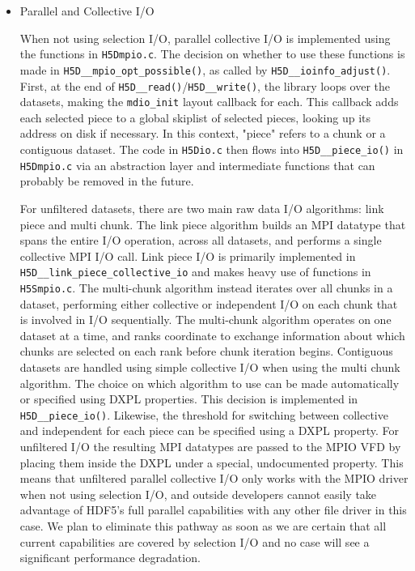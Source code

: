 \begin{itemize}
    \item Parallel and Collective I/O

When not using selection I/O, parallel collective I/O is implemented using the functions in \texttt{H5Dmpio.c}. The decision on whether to use these functions is made in \texttt{H5D\_\_mpio\_opt\_possible()}, as called by \texttt{H5D\_\_ioinfo\_adjust()}. First, at the end of \texttt{H5D\_\_read()}/\texttt{H5D\_\_write()}, the library loops over the datasets, making the \texttt{mdio\_init} layout callback for each. This callback adds each selected piece to a global skiplist of selected pieces, looking up its address on disk if necessary. In this context, "piece" refers to a chunk or a contiguous dataset. The code in \texttt{H5Dio.c} then flows into \texttt{H5D\_\_piece\_io()} in \texttt{H5Dmpio.c} via an abstraction layer and intermediate functions that can probably be removed in the future.

For unfiltered datasets, there are two main raw data I/O algorithms: link piece and multi chunk. The link piece algorithm builds an MPI datatype that spans the entire I/O operation, across all datasets, and performs a single collective MPI I/O call. Link piece I/O is primarily implemented in \texttt{H5D\_\_link\_piece\_collective\_io} and makes heavy use of functions in \texttt{H5Smpio.c}. The multi-chunk algorithm instead iterates over all chunks in a dataset, performing either collective or independent I/O on each chunk that is involved in I/O sequentially. The multi-chunk algorithm operates on one dataset at a time, and ranks coordinate to exchange information about which chunks are selected on each rank before chunk iteration begins. Contiguous datasets are handled using simple collective I/O when using the multi chunk algorithm. The choice on which algorithm to use can be made automatically or specified using DXPL properties. This decision is implemented in \texttt{H5D\_\_piece\_io()}. Likewise, the threshold for switching between collective and independent for each piece can be specified using a DXPL property. For unfiltered I/O the resulting MPI datatypes are passed to the MPIO VFD by placing them inside the DXPL under a special, undocumented property. This means that unfiltered parallel collective I/O only works with the MPIO driver when not using selection I/O, and outside developers cannot easily take advantage of HDF5's full parallel capabilities with any other file driver in this case. We plan to eliminate this pathway as soon as we are certain that all current capabilities are covered by selection I/O and no case will see a significant performance degradation.


\end{itemize}

